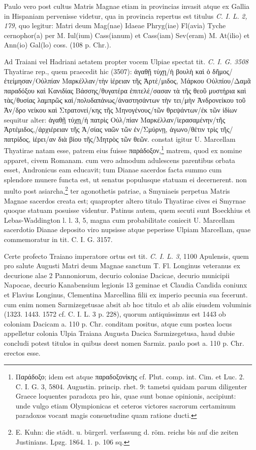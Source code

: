 \documentclass[a4paper, 11pt, oneside, polutonikogreek, german]{article}
\begin{document}
Paulo vero post cultus Matris Magnae etiam in provincias invasit atque ex Gallia in Hispaniam pervenisse videtur, qua in provincia repertus est titulus \emph{C. I. L. 2, 179}, quo legitur: Matri deum Mag(nae) Idaeae Phryg(iae) Fl(avia) Tyche cernophor(a) per M. Iul(ium) Cass(ianum) et Cass(iam) Sev(eram) M. At(ilio) et Ann(io) Gal(lo) coss. (108 p. Chr.).

Ad Traiani vel Hadriani aetatem propter vocem Ulpiae spectat tit. \emph{C. I. G. 3508} Thyatirae rep., quem praecedit hic (3507): ἀγαθῇ τύχῃ/ἡ βουλὴ καὶ ὁ δῆμος/ἐτείμησαν/Οὐλπίαν Μαρκέλλαν/τὴν ἱέρειαν τῆς Ἀρτέ/μιδος, Μάρκου Οὐλπίου/Δαμᾶ παραδόξου καὶ Κανιδίας Βάσσης/θυγατέρα ἐπιτελέ/σασαν τὰ τῆς θεοῦ μυστήρια καὶ τὰς/θυσίας λαμπρῶς καὶ/πολυδαπάνως/ἀναστησάντων τὴν τει/μὴν Ἀνδρονείκου τοῦ Ἀν/δρο νείκου καὶ Στρατονεί/κης τῆς Μηνογένους/τῶν θρεψάντων/ἐκ τῶν ἰδίων sequitur alter: ἀγαθῇ τύχῃ/ἡ πατρὶς Οὐλ/πίαν Μαρκέλλαν/ἱερασαμένην/τῆς Ἀρτέμιδος,/ἀρχιέρειαν τῆς Ἀ/σίας ναῶν τῶν ἐν/Σμύρνῃ, ἀγωνο/θέτιν τρὶς τῆς/πατρίδος, ἱέρει/αν διὰ βίου τῆς/Μητρὸς τῶν θεῶν. constat igitur U. Marcellam Thyatirae natam esse, patrem eius fuisse παράδοξον,\footnote{Παράδοξο; idem est atque παραδοξονίκης cf. Plut. comp. int. Cim. et Luc. 2. C. I. G. 3, 5804. Augustin. princip. rhet. 9: tametsi quidam parum diligenter Graece loquentes paradoxa pro his, quae sunt bonae opinionis, accipiunt: unde vulgo etiam Olympionicas et ceteros victores sacrorum certaminum paradoxos vocant magis consuetudine quam ratione ducti.} matrem, quod ex nomine apparet, civem Romanam. cum vero admodum adulescens parentibus orbata esset, Andronicus eam educavit; tum Dianae sacerdos facta summo cum splendore munere functa est, ut senatus populusque statuam ei decernerent. non multo post asiarcha,\footnote{E. Kuhn: die städt. u. bürgerl. verfassung d. röm. reichs bis auf die zeiten Justinians. Lpzg. 1864. 1. p. 106 sq.} ter agonothetis patriae, a Smyniaeis perpetua Matris Magnae sacerdos creata est; quapropter altero titulo Thyatirae cives ei Smyrnae quoque statuam posuisse videntur. Patinus autem, quem secuti sunt Boeckhius et Lebas-Waddington l. l. 3, 5, magna cum probabilitate coniecit U. Marcellam sacerdotio Dianae deposito viro nupsisse atque peperisse Ulpiam Marcellam, quae commemoratur in tit. C. I. G. 3157.

Certe profecto Traiano imperatore ortus est tit. \emph{C. I. L. 3}, 1100 Apulensis, quem pro salute Augusti Matri deum Magnae sanctum T. Fl. Longinus veteranus ex decurione alae 2 Pannoniorum, decurio coloniae Dacicae, decurio municipii Napocae, decurio Kanabensium legionis 13 geminae et Claudia Candida coniunx et Flavius Longinus, Clementina Marcellina filii ex imperio pecunia sua fecerunt. cum enim nomen Sarmizegetusae absit ab hoc titulo et ab aliis eiusdem voluminis (1323. 1443. 1572 cf. C. I. L. 3 p. 228), quorum antiquissimus est 1443 ob coloniam Dacicam a. 110 p. Chr. conditam positus, atque cum postea locus appelletur colonia Ulpia Traiana Augusta Dacica Sarmizegetusa, haud dubie concludi potest titulos in quibus deest nomen Sarmiz. paulo post a. 110 p. Chr. erectos esse.
\end{document}
